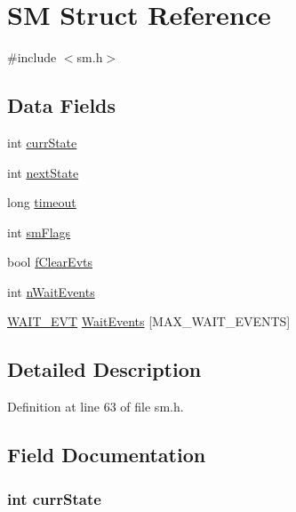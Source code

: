 \hypertarget{struct_s_m}{
\section{SM Struct Reference}
\label{struct_s_m}
}


{\ttfamily \#include $<$sm.h$>$}

\subsection*{Data Fields}
\begin{DoxyCompactItemize}
\item 
int \hyperlink{struct_s_m_a77a155d9268cc6f32d263526c9ff4542}{currState}
\item 
int \hyperlink{struct_s_m_a18e5a6ae4af63222c56c48bdb1161080}{nextState}
\item 
long \hyperlink{struct_s_m_a0eb73e1ac837828209a5b842000fa3b0}{timeout}
\item 
int \hyperlink{struct_s_m_aa0b5dc80983d3debd32a307496d90982}{smFlags}
\item 
bool \hyperlink{struct_s_m_a4ed076f11e5fce48ed3663d59456af2b}{fClearEvts}
\item 
int \hyperlink{struct_s_m_a8cae14ab3b0fb7c0aaf3c8f4e6a374a1}{nWaitEvents}
\item 
\hyperlink{struct_w_a_i_t___e_v_t}{WAIT\_\-EVT} \hyperlink{struct_s_m_a952b78bab0b85b9c93ecd00e76214247}{WaitEvents} \mbox{[}MAX\_\-WAIT\_\-EVENTS\mbox{]}
\end{DoxyCompactItemize}


\subsection{Detailed Description}


Definition at line 63 of file sm.h.



\subsection{Field Documentation}
\hypertarget{struct_s_m_a77a155d9268cc6f32d263526c9ff4542}{
\subsubsection[{currState}]{\setlength{\rightskip}{0pt plus 5cm}int {\bf currState}}}
\label{struct_s_m_a77a155d9268cc6f32d263526c9ff4542}



